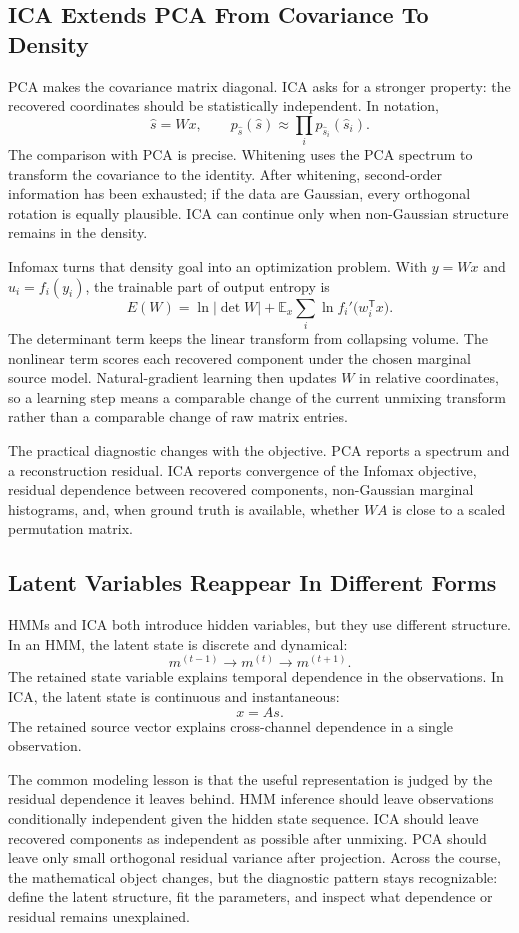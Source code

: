 \subsection{ICA Extends PCA From Covariance To Density}

PCA makes the covariance matrix diagonal. ICA asks for a stronger property: the recovered coordinates should be statistically independent. In notation,
\[
  \hat{s}=Wx,
  \qquad
  p_{\hat{s}}(\hat{s})
  \approx
  \prod_i p_{\hat{s}_i}(\hat{s}_i).
\]
The comparison with PCA is precise. Whitening uses the PCA spectrum to transform the covariance to the identity. After whitening, second-order information has been exhausted; if the data are Gaussian, every orthogonal rotation is equally plausible. ICA can continue only when non-Gaussian structure remains in the density.

Infomax turns that density goal into an optimization problem. With \(y=Wx\) and \(u_i=f_i(y_i)\), the trainable part of output entropy is
\[
  E(W)
  =
  \ln|\det W|
  +
  \mathbb{E}_x
  \sum_i
  \ln f_i'\bigl(w_i^{\mathsf{T}}x\bigr).
\]
The determinant term keeps the linear transform from collapsing volume. The nonlinear term scores each recovered component under the chosen marginal source model. Natural-gradient learning then updates \(W\) in relative coordinates, so a learning step means a comparable change of the current unmixing transform rather than a comparable change of raw matrix entries.

The practical diagnostic changes with the objective. PCA reports a spectrum and a reconstruction residual. ICA reports convergence of the Infomax objective, residual dependence between recovered components, non-Gaussian marginal histograms, and, when ground truth is available, whether \(WA\) is close to a scaled permutation matrix.

\subsection{Latent Variables Reappear In Different Forms}

HMMs and ICA both introduce hidden variables, but they use different structure. In an HMM, the latent state is discrete and dynamical:
\[
  m^{(t-1)}\to m^{(t)}\to m^{(t+1)}.
\]
The retained state variable explains temporal dependence in the observations. In ICA, the latent state is continuous and instantaneous:
\[
  x=As.
\]
The retained source vector explains cross-channel dependence in a single observation.

The common modeling lesson is that the useful representation is judged by the residual dependence it leaves behind. HMM inference should leave observations conditionally independent given the hidden state sequence. ICA should leave recovered components as independent as possible after unmixing. PCA should leave only small orthogonal residual variance after projection. Across the course, the mathematical object changes, but the diagnostic pattern stays recognizable: define the latent structure, fit the parameters, and inspect what dependence or residual remains unexplained.
